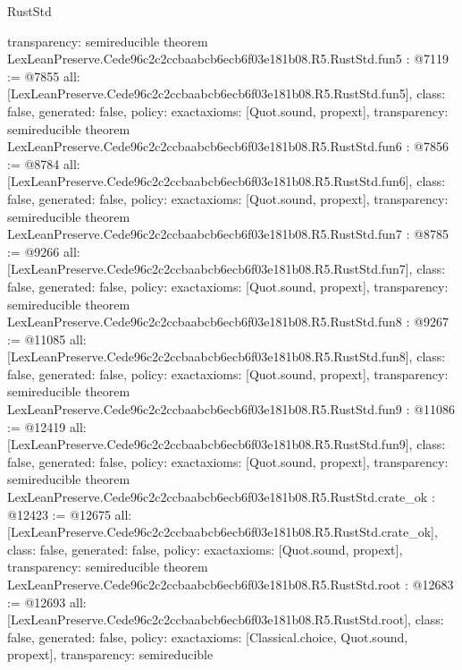 \begin{lexlean}{RustStd}
\begin{coremodule}
{  transparency: semireducible
}
theorem LexLeanPreserve.Cede96c2c2ccbaabcb6ecb6f03e181b08.R5.RustStd.fun5 : @7119 := @7855 {
  all: [LexLeanPreserve.Cede96c2c2ccbaabcb6ecb6f03e181b08.R5.RustStd.fun5],
  class: false,
  generated: false,
  policy: exact{axioms: [Quot.sound, propext]},
  transparency: semireducible
}
theorem LexLeanPreserve.Cede96c2c2ccbaabcb6ecb6f03e181b08.R5.RustStd.fun6 : @7856 := @8784 {
  all: [LexLeanPreserve.Cede96c2c2ccbaabcb6ecb6f03e181b08.R5.RustStd.fun6],
  class: false,
  generated: false,
  policy: exact{axioms: [Quot.sound, propext]},
  transparency: semireducible
}
theorem LexLeanPreserve.Cede96c2c2ccbaabcb6ecb6f03e181b08.R5.RustStd.fun7 : @8785 := @9266 {
  all: [LexLeanPreserve.Cede96c2c2ccbaabcb6ecb6f03e181b08.R5.RustStd.fun7],
  class: false,
  generated: false,
  policy: exact{axioms: [Quot.sound, propext]},
  transparency: semireducible
}
theorem LexLeanPreserve.Cede96c2c2ccbaabcb6ecb6f03e181b08.R5.RustStd.fun8 : @9267 := @11085 {
  all: [LexLeanPreserve.Cede96c2c2ccbaabcb6ecb6f03e181b08.R5.RustStd.fun8],
  class: false,
  generated: false,
  policy: exact{axioms: [Quot.sound, propext]},
  transparency: semireducible
}
theorem LexLeanPreserve.Cede96c2c2ccbaabcb6ecb6f03e181b08.R5.RustStd.fun9 : @11086 := @12419 {
  all: [LexLeanPreserve.Cede96c2c2ccbaabcb6ecb6f03e181b08.R5.RustStd.fun9],
  class: false,
  generated: false,
  policy: exact{axioms: [Quot.sound, propext]},
  transparency: semireducible
}
theorem LexLeanPreserve.Cede96c2c2ccbaabcb6ecb6f03e181b08.R5.RustStd.crate_ok : @12423 := @12675 {
  all: [LexLeanPreserve.Cede96c2c2ccbaabcb6ecb6f03e181b08.R5.RustStd.crate_ok],
  class: false,
  generated: false,
  policy: exact{axioms: [Quot.sound, propext]},
  transparency: semireducible
}
theorem LexLeanPreserve.Cede96c2c2ccbaabcb6ecb6f03e181b08.R5.RustStd.root : @12683 := @12693 {
  all: [LexLeanPreserve.Cede96c2c2ccbaabcb6ecb6f03e181b08.R5.RustStd.root],
  class: false,
  generated: false,
  policy: exact{axioms: [Classical.choice, Quot.sound, propext]},
  transparency: semireducible
}


\end{coremodule}
\end{lexlean}
